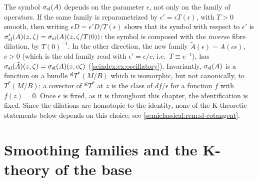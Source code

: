 \begin{remark}\label{scindex:rem:slT}
  The symbol $\sigma_{\mathrm{sl}}(A)$ depends on the parameter $\epsilon$, not only on the
  family of operators. If the same family is reparametrized by
  $\epsilon'=\epsilon T(\epsilon)$, with $T>0$ smooth, then writing
  $\epsilon D=\epsilon'D/T(\epsilon)$ shows that its symbol with respect to
  $\epsilon'$ is $\sigma_{\mathrm{sl}}'(A)(z,\zeta)=\sigma_{\mathrm{sl}}(A)(z,\zeta/T(0))$: the symbol is
  composed with the \emph{inverse} fibre dilation, by $T(0)^{-1}$. In the other
  direction, the new family $\tilde A(\epsilon)=A(c\epsilon)$, $c>0$ (which is the
  old family read with $\epsilon'=\epsilon/c$, i.e.\ $T\equiv c^{-1}$), has
  $\sigma_{\mathrm{sl}}(\tilde A)(z,\zeta)=\sigma_{\mathrm{sl}}(A)(z,c\zeta)$
  (\cref{scindex:ex:oscillatory}).
  Invariantly, $\sigma_{\mathrm{sl}}(A)$ is a function on a bundle ${}^{\mathrm{sl}}T^*(M/B)$
  which is isomorphic, but not canonically, to $T^*(M/B)$; a covector of
  ${}^{\mathrm{sl}}T^*$ at $z$ is the class of $df/\epsilon$ for a function $f$
  with $f(z)=0$. Once $\epsilon$ is fixed, as it is throughout this chapter, the
  identification is fixed. Since the dilations are homotopic to the identity,
  none of the K-theoretic statements below depends on this choice; see
  \cref{semiclassical:rem:sl-cotangent}.
\end{remark}

\section{Smoothing families and the K-theory of the base}\label{scindex:sec:smoothing}

